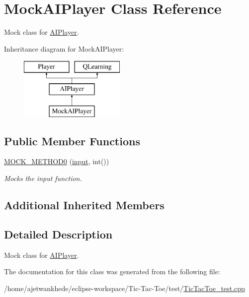 \hypertarget{classMockAIPlayer}{}\section{Mock\+A\+I\+Player Class Reference}
\label{classMockAIPlayer}


Mock class for \mbox{\hyperlink{classAIPlayer}{A\+I\+Player}}.  


Inheritance diagram for Mock\+A\+I\+Player\+:\begin{figure}[H]
\begin{center}
\leavevmode
\includegraphics[height=3.000000cm]{classMockAIPlayer}
\end{center}
\end{figure}
\subsection*{Public Member Functions}
\begin{DoxyCompactItemize}
\item 
\mbox{\label{classMockAIPlayer_a196fe4d49a43282fe67a0d47da6c62f3}} 
\mbox{\hyperlink{classMockAIPlayer_a196fe4d49a43282fe67a0d47da6c62f3}{M\+O\+C\+K\+\_\+\+M\+E\+T\+H\+O\+D0}} (\mbox{\hyperlink{classAIPlayer_a4a431bc5cf71781bdd311b08c47d27dc}{input}}, int())
\begin{DoxyCompactList}\small\item\em Mocks the input function. \end{DoxyCompactList}\end{DoxyCompactItemize}
\subsection*{Additional Inherited Members}


\subsection{Detailed Description}
Mock class for \mbox{\hyperlink{classAIPlayer}{A\+I\+Player}}. 

The documentation for this class was generated from the following file\+:\begin{DoxyCompactItemize}
\item 
/home/ajetwankhede/eclipse-\/workspace/\+Tic-\/\+Tac-\/\+Toe/test/\mbox{\hyperlink{TicTacToe__test_8cpp}{Tic\+Tac\+Toe\+\_\+test.\+cpp}}\end{DoxyCompactItemize}
